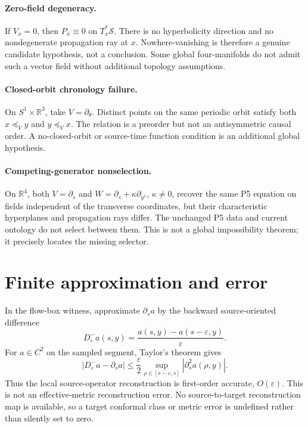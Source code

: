 \documentclass[11pt]{article}
\newcommand{\Sub}{\mathcal S}
\begin{document}
\paragraph{Zero-field degeneracy.}
If \(V_x=0\), then \(P_x\equiv0\) on \(T_x^*\Sub\).  There is no
hyperbolicity direction and no nondegenerate propagation ray at \(x\).
Nowhere-vanishing is therefore a genuine candidate hypothesis, not a
conclusion.  Some global four-manifolds do not admit such a vector field
without additional topology assumptions.

\paragraph{Closed-orbit chronology failure.}
On \(S^1\times\mathbb R^3\), take \(V=\partial_\theta\).  Distinct points on
the same periodic orbit satisfy both \(x\preceq_Vy\) and
\(y\preceq_Vx\).  The relation is a preorder but not an antisymmetric causal
order.  A no-closed-orbit or source-time function condition is an additional
global hypothesis.

\paragraph{Competing-generator nonselection.}
On \(\mathbb R^4\), both
\(V=\partial_s\) and \(W=\partial_s+\kappa\partial_{y^1}\),
\(\kappa\neq0\), recover the same P5 equation on fields independent of the
transverse coordinates, but their characteristic hyperplanes and propagation
rays differ.  The unchanged P5 data and current ontology do not select
between them.  This is not a global impossibility theorem; it precisely
locates the missing selector.

\section{Finite approximation and error}

In the flow-box witness, approximate \(\partial_sa\) by the backward
source-oriented difference
\[
 D^-_\varepsilon a(s,y)
 =\frac{a(s,y)-a(s-\varepsilon,y)}{\varepsilon}.
\tag{12}\label{eq:upwind}
\]
For \(a\in C^2\) on the sampled segment, Taylor's theorem gives
\[
 \left|D^-_\varepsilon a-\partial_sa\right|
 \leq
 \frac{\varepsilon}{2}
 \sup_{\rho\in[s-\varepsilon,s]}
 |\partial_s^2a(\rho,y)|.
\tag{13}\label{eq:error}
\]
Thus the local source-operator reconstruction is first-order accurate,
\(O(\varepsilon)\).  This is not an effective-metric reconstruction error.
No source-to-target reconstruction map is available, so a target conformal
class or metric error is undefined rather than silently set to zero.
\end{document}
